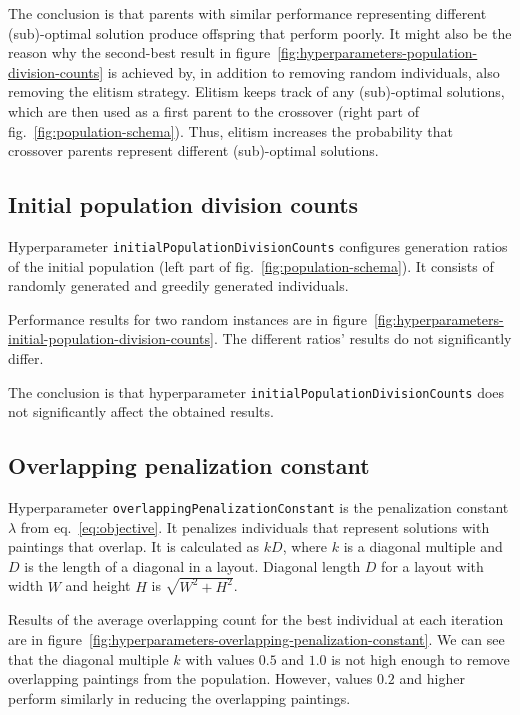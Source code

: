 The conclusion is that parents with similar performance representing different (sub)-optimal solution
produce offspring that perform poorly.
It might also be the reason why the second-best result in figure~\ref{fig:hyperparameters-population-division-counts}
is achieved by, in addition to removing random individuals, also removing the elitism strategy.
Elitism keeps track of any (sub)-optimal solutions, which are then used as a first parent
to the crossover (right part of fig.~\ref{fig:population-schema}).
Thus, elitism increases the probability that crossover parents represent different (sub)-optimal solutions.

\subsection{Initial population division counts}\label{subsec:initial-population-division-counts}
Hyperparameter \verb|initialPopulationDivisionCounts| configures generation ratios of the initial population (left part of fig.~\ref{fig:population-schema}).
It consists of randomly generated and greedily generated individuals.

Performance results for two random instances are in figure~\ref{fig:hyperparameters-initial-population-division-counts}.
The different ratios' results do not significantly differ.

The conclusion is that hyperparameter \verb|initialPopulationDivisionCounts| does not significantly affect the obtained results.

\subsection{Overlapping penalization constant}\label{subsec:overlapping-penalization-constant}

Hyperparameter \verb|overlappingPenalizationConstant| is the penalization constant $\lambda$ from eq.~\ref{eq:objective}.
It penalizes individuals that represent solutions with paintings that overlap.
It is calculated as $kD$, where $k$ is a diagonal multiple and $D$ is the length of a diagonal in a layout.
Diagonal length $D$ for a layout with width $W$ and height  $H$ is $\sqrt{W^2 + H^2}$.

Results of the average overlapping count for the best individual at each iteration are in figure~\ref{fig:hyperparameters-overlapping-penalization-constant}.
We can see that the diagonal multiple $k$ with values $0.5$ and $1.0$ is not high enough to remove overlapping paintings from the population.
However, values $0.2$ and higher perform similarly in reducing the overlapping paintings.

